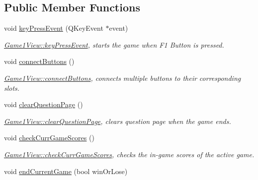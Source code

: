 \subsection*{Public Member Functions}
\begin{DoxyCompactItemize}
\item 
void \hyperlink{classGame1View_a013dc48c98ecb2c52516d433aac4a112}{key\+Press\+Event} (Q\+Key\+Event $\ast$event)
\begin{DoxyCompactList}\small\item\em \hyperlink{classGame1View_a013dc48c98ecb2c52516d433aac4a112}{Game1\+View\+::key\+Press\+Event}, starts the game when F1 Button is pressed. \end{DoxyCompactList}\item 
\mbox{\label{classGame1View_a2209a714e878e9654d980006360bc855}} 
void \hyperlink{classGame1View_a2209a714e878e9654d980006360bc855}{connect\+Buttons} ()
\begin{DoxyCompactList}\small\item\em \hyperlink{classGame1View_a2209a714e878e9654d980006360bc855}{Game1\+View\+::connect\+Buttons}, connects multiple buttons to their corresponding slots. \end{DoxyCompactList}\item 
\mbox{\label{classGame1View_abb63a59f922e1104fa88f3c7561831b5}} 
void \hyperlink{classGame1View_abb63a59f922e1104fa88f3c7561831b5}{clear\+Question\+Page} ()
\begin{DoxyCompactList}\small\item\em \hyperlink{classGame1View_abb63a59f922e1104fa88f3c7561831b5}{Game1\+View\+::clear\+Question\+Page}, clears question page when the game ends. \end{DoxyCompactList}\item 
\mbox{\label{classGame1View_a0d292597798333a5465a540f38d6fe86}} 
void \hyperlink{classGame1View_a0d292597798333a5465a540f38d6fe86}{check\+Curr\+Game\+Scores} ()
\begin{DoxyCompactList}\small\item\em \hyperlink{classGame1View_a0d292597798333a5465a540f38d6fe86}{Game1\+View\+::check\+Curr\+Game\+Scores}, checks the in-\/game scores of the active game. \end{DoxyCompactList}\item 
void \hyperlink{classGame1View_ad1c25c3de31c9b0181af7e837284b0d5}{end\+Current\+Game} (bool win\+Or\+Lose)

\end{DoxyCompactItemize}

